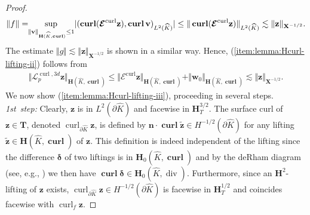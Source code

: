 \documentclass{article}
\begin{document}
\begin{proof}
\begin{align*}
\Vert f\Vert =\!\! \operatornamewithlimits{sup}_{\Vert\mathbf{v}\Vert_{\mathbf{H}(\widehat{K},\operatorname*{\mathbf{curl}})} \leq 1} \! |(\operatorname*{\mathbf{curl}}(\boldsymbol{\mathcal{E}}^{\operatorname*{curl}}\mathbf{z}),\operatorname*{\mathbf{curl}}\mathbf{v})_{L^2(\widehat{K})}| \leq \Vert\operatorname*{\mathbf{curl}}(\boldsymbol{\mathcal{E}}^{\operatorname*{curl}}\mathbf{z})\Vert_{L^2(\widehat{K})} \lesssim \Vert\mathbf{z}\Vert_{\mathbf{X}^{-1/2}}.
\end{align*}
The estimate
$\displaystyle \Vert g\Vert \lesssim \Vert\mathbf{z}\Vert_{\mathbf{X}^{-1/2}}
$
is shown in a similar way. Hence, (\ref{item:lemma:Hcurl-lifting-ii}) follows from
\begin{align*}
\Vert\boldsymbol{\mathcal{L}}^{\operatorname*{curl},3d}_p\mathbf{z}\Vert_{\mathbf{H}(\widehat{K},\operatorname*{\mathbf{curl}})} \leq \Vert\boldsymbol{\mathcal{E}}^{\operatorname*{curl}}\mathbf{z}\Vert_{\mathbf{H}(\widehat{K},\operatorname*{\mathbf{curl}})} + \Vert\mathbf{w}_0\Vert_{\mathbf{H}(\widehat{K},\operatorname*{\mathbf{curl}})} \lesssim \Vert\mathbf{z}\Vert_{\mathbf{X}^{-1/2}}.
\end{align*}
We now show (\ref{item:lemma:Hcurl-lifting-iii}), proceeding in several steps. 
\newline 
\emph{1st~step:} 
Clearly, ${\mathbf z}$ is in $L^2(\partial \widehat K)$ and facewise in ${\mathbf H}^{3/2}_T$. 
The surface curl of ${\mathbf z} \in {\mathbf T}$, 
denoted $\operatorname{curl}_{\partial\widehat K} {\mathbf z}$, is defined by 
${\mathbf n} \cdot \operatorname{\mathbf{curl}} \widetilde{\mathbf z} \in H^{-1/2}(\partial\widehat K)$ 
for any lifting $\widetilde{\mathbf  z} \in {\mathbf H}(\widehat K,\operatorname{\mathbf{curl}})$
of ${\mathbf z}$. 
This definition is indeed independent of the lifting since the difference 
${\boldsymbol \delta}$ of two liftings is in ${\mathbf H}_0(\widehat K,\operatorname{\mathbf{curl}})$
and by the deRham diagram (see, e.g., \cite[eqn. (3.60)]{Monkbook}) we then have  
$\operatorname{\mathbf{curl}} {\boldsymbol \delta} \in {\mathbf H}_0(\widehat K,\operatorname{div})$. 
Furthermore, since an ${\mathbf H}^2$-lifting of ${\mathbf z}$ exists, 
$\operatorname{curl}_{\partial\widehat K} {\mathbf z} \in H^{-1/2}(\partial\widehat K)$ is facewise in ${\mathbf H}_T^{1/2}$ and coincides 
facewise with $\operatorname{curl}_f {\mathbf  z}$. 


\end{proof}
\end{document}
